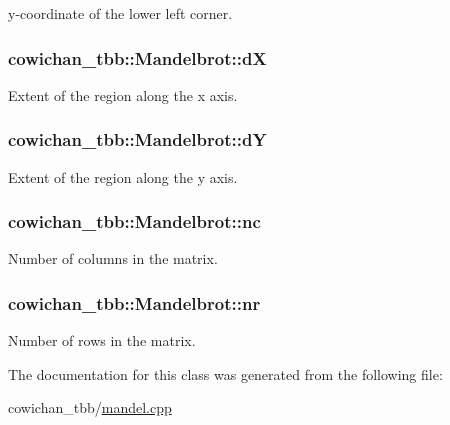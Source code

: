 y-coordinate of the lower left corner. \hypertarget{classcowichan__tbb_1_1_mandelbrot_cbe2697988d27d656dcb12fcf06674c7}{
\subsubsection[{dX}]{ {\bf cowichan\_\-tbb::Mandelbrot::dX}}}
\label{classcowichan__tbb_1_1_mandelbrot_cbe2697988d27d656dcb12fcf06674c7}


Extent of the region along the x axis. \hypertarget{classcowichan__tbb_1_1_mandelbrot_8fc166fc3009c058ef4b6582755f5f52}{
\subsubsection[{dY}]{ {\bf cowichan\_\-tbb::Mandelbrot::dY}}}
\label{classcowichan__tbb_1_1_mandelbrot_8fc166fc3009c058ef4b6582755f5f52}


Extent of the region along the y axis. \hypertarget{classcowichan__tbb_1_1_mandelbrot_6eed478f27f441f57438392515f0f575}{
\subsubsection[{nc}]{ {\bf cowichan\_\-tbb::Mandelbrot::nc}}}
\label{classcowichan__tbb_1_1_mandelbrot_6eed478f27f441f57438392515f0f575}


Number of columns in the matrix. \hypertarget{classcowichan__tbb_1_1_mandelbrot_698768b13a40cbab1410a4e162d1e450}{
\subsubsection[{nr}]{ {\bf cowichan\_\-tbb::Mandelbrot::nr}}}
\label{classcowichan__tbb_1_1_mandelbrot_698768b13a40cbab1410a4e162d1e450}


Number of rows in the matrix. 

The documentation for this class was generated from the following file:\begin{CompactItemize}
\item 
cowichan\_\-tbb/\hyperlink{cowichan__tbb_2mandel_8cpp}{mandel.cpp}\end{CompactItemize}

